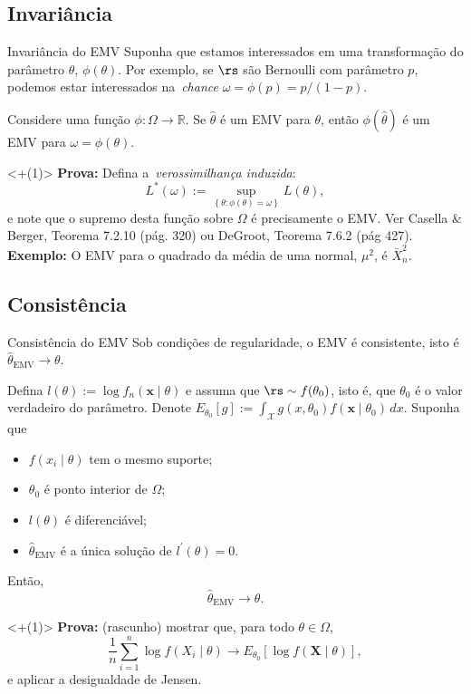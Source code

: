 \subsection*{Invariância} 
\begin{frame}{Invariância do EMV}
Suponha que estamos interessados em uma transformação do parâmetro $\theta$, $\phi(\theta)$.
Por exemplo, se $\rs$ são Bernoulli com parâmetro $p$,  podemos estar interessados na~\textit{chance} $\omega = \phi(p) = p/(1-p)$.
\begin{theo}
\label{thm:invariance_MLE}
 Considere uma função $\phi : \Omega \to \mathbb{R}$.
 Se $\hat{\theta}$ é um EMV para $\theta$, então $\phi(\hat{\theta})$ é um EMV para $\omega = \phi(\theta)$.
\end{theo}
\uncover<+(1)>{
\textbf{Prova:} Defina a~\textit{verossimilhança induzida}:
\[ L^\ast(\omega) := \sup_{\left\{ \theta: \phi(\theta) = \omega \right\}} L(\theta), \]
e note que o supremo desta função sobre $\Omega$ é precisamente o EMV.
Ver Casella \& Berger, Teorema 7.2.10 (pág. 320) ou DeGroot, Teorema 7.6.2 (pág 427).
}
\textbf{Exemplo:} O EMV para o quadrado da média de uma normal, $\mu^2$, é $\bar{X}_n^2$.
\end{frame}

\subsection*{Consistência} 

\begin{frame}{Consistência do EMV}
Sob condições de regularidade, o EMV é consistente, isto é $\hat{\theta}_{\text{EMV}} \xrightarrow{} \theta$.
\begin{theo}
\label{thm:consistency_MLE}
Defina $l(\theta) := \log f_n(\boldsymbol{x} \mid \theta)$ e assuma que $\rs \sim f(\theta_0)$, isto é, que $\theta_0$ é o valor verdadeiro do parâmetro.
Denote $E_{\theta_0}[g] := \int_{\mathcal{X}} g(x, \theta_0) f(\boldsymbol{x} \mid \theta_0)\, dx$.
 Suponha que 
 \begin{itemize}
  \item $f(x_i \mid \theta)$ tem o mesmo suporte;
  \item $\theta_0$ é ponto interior de $\Omega$;
  \item $l(\theta)$ é diferenciável;
  \item $\hat{\theta}_{\text{EMV}}$ é a única solução de $l^\prime(\theta) = 0$.
 \end{itemize}
   Então,
  $$\hat{\theta}_{\text{EMV}} \xrightarrow{} \theta.$$
\end{theo}
\uncover<+(1)>{
\textbf{Prova:} (rascunho) mostrar que, para todo $\theta \in \Omega$,
\[ \frac{1}{n} \sum_{i=1}^n \log f(X_i \mid \theta) \xrightarrow{} E_{\theta_0}\left[ \log f(\boldsymbol{X} \mid \theta) \right], \]
e aplicar a desigualdade de Jensen.
}
\end{frame}

